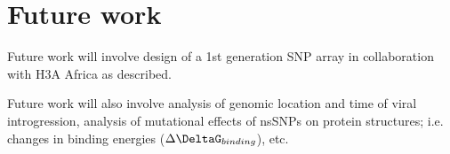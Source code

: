 \chapter{Future work}
\label{chap:future}

Future work will involve design of a 1st generation SNP array in collaboration with H3A Africa as described.

Future work will also involve analysis of genomic location and time of viral introgression, analysis of mutational effects of nsSNPs on protein structures; i.e. changes in binding energies ($\Delta\DeltaG_{binding}$), etc.